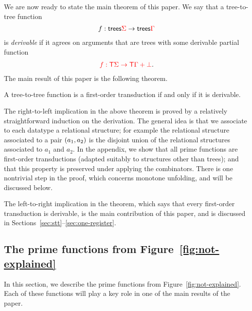  We are now ready to state the main theorem of this paper. 
We say that a tree-to-tree function  
    \begin{align*}
        f : \mathsf {trees} {\color{red}{\Sigma}} \to \mathsf {trees} {\color{red}{\Gamma}}
    \end{align*}
    is \emph{derivable} if it agrees on arguments that are trees with some derivable partial function
    \begin{align*}
        {\color{red}{f : {\color{red}{\mathsf T}}\Sigma \to {\color{red}{\mathsf T}}\Gamma + {\color{red}{\bot}}}}.
    \end{align*}
The main result of this paper is the following theorem.
\begin{theorem}\label{thm:main} A tree-to-tree function is a first-order transduction if and only if it is derivable.
\end{theorem}


The right-to-left implication in the above theorem is proved by a relatively straightforward induction on the derivation. The general idea is that we associate to each datatype a relational structure; for example the relational structure associated to a pair $(a_1,a_2)$ is the disjoint union of the relational structures associated to $a_1$ and $a_2$.  In the appendix, we show that all prime functions are first-order transductions (adapted suitably to structures other than trees); and that this property is preserved under applying the combinators. There is one nontrivial step in the proof, which concerns monotone unfolding, and will be discussed below.  

The  left-to-right implication in the theorem, which says that every first-order transduction is derivable, is the main contribution of this paper, and is discussed in Sections~\ref{sec:stt}--\ref{sec:one-register}.


%
\subsection{The prime functions from Figure~\ref{fig:not-explained}}
\label{sec:prime-and-combinators}
In this section, we  describe the prime functions from Figure~\ref{fig:not-explained}. 
Each of these functions will play a key role in one of the main results of the paper.


